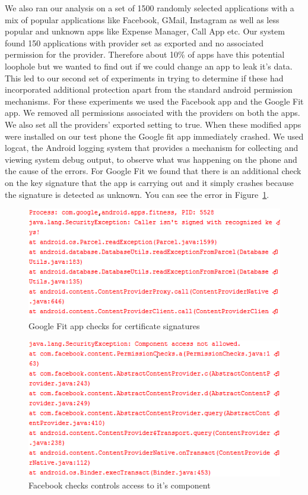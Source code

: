 We also ran our analysis on a set of 1500 randomly selected applications with a mix of popular applications like Facebook, GMail, Instagram as well as less popular and unknown apps like Expense Manager, Call App etc. Our system found 150 applications with provider set as exported and no associated permission for the provider. Therefore about 10\% of apps have this potential loophole but we wanted to find out if we could change an app to leak it's data. This led to our second set of experiments in trying to determine if these had incorporated additional protection apart from the standard android permission mechanisms. For these experiments we used the Facebook app and the Google Fit app. We removed all permissions associated with the providers on both the apps. We also set all the providers' exported setting to true. When these modified apps were installed on our test phone the Google fit app immediately crashed. We used logcat, the Android logging system that provides a mechanism for collecting and viewing system debug output, to observe what was happening on the phone and the cause of the errors. For Google Fit we found that there is an additional check on the key signature that the app is carrying out and it simply crashes because the signature is detected as unknown. You can see the error in Figure~\ref{fig:GoogleProtections}.

\begin{figure}[tb]
\centering
	\includegraphics[width=\columnwidth]{images/GoogleProtections}
	\caption{Google Fit app checks for certificate signatures}
	\label{fig:GoogleProtections}
\end{figure}

\begin{figure}[tb]
\centering
	\includegraphics[width=\columnwidth]{images/FBProtections}
	\caption{Facebook checks controls access to it's component}
	\label{fig:FBProtections}
\end{figure}

